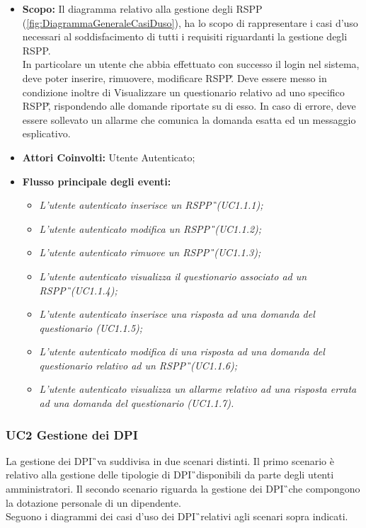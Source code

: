 		\begin{itemize}
			\item \textbf{Scopo:} Il diagramma relativo alla gestione degli RSPP (\autoref{fig:DiagrammaGeneraleCasiDuso}), ha lo scopo di rappresentare i casi d'uso necessari al soddisfacimento di tutti i requisiti riguardanti la gestione degli RSPP. \\
			In particolare un utente che abbia effettuato con successo il login nel sistema, deve poter inserire, rimuovere, modificare  \gls{RSPP}\G. Deve essere messo in condizione inoltre di Visualizzare un questionario relativo ad uno specifico \gls{RSPP}\G, rispondendo alle domande riportate su di esso. In caso di errore, deve essere sollevato un allarme che comunica la domanda esatta ed un messaggio esplicativo.
			\item \textbf{Attori Coinvolti:} Utente Autenticato;
			\item \textbf{Flusso principale degli eventi:} 
			\begin{itemize}
				\item \textit{L'utente autenticato inserisce un \gls{RSPP}\G\ (UC1.1.1);}
				\item \textit{L'utente autenticato modifica un \gls{RSPP}\G\ (UC1.1.2);}
				\item \textit{L'utente autenticato rimuove un \gls{RSPP}\G\  (UC1.1.3);}
				\item \textit{L'utente autenticato visualizza il questionario associato ad un \gls{RSPP}\G\  (UC1.1.4);}
				\item \textit{L'utente autenticato inserisce una risposta ad una domanda del questionario (UC1.1.5);}
				\item \textit{L'utente autenticato modifica di una risposta ad una domanda del questionario relativo ad un \gls{RSPP}\G\  (UC1.1.6);}
				\item \textit{ L'utente autenticato visualizza un allarme relativo ad una risposta errata ad una domanda del questionario (UC1.1.7).}
			\end{itemize}
		\end{itemize}
	\newpage	
	\subsubsection{UC2 Gestione dei DPI}
		\label{section:UC2}
		La gestione dei  \gls{DPI}\G\ va suddivisa in due scenari distinti. Il primo scenario è relativo alla gestione delle tipologie di \gls{DPI}\G\ disponibili da parte degli utenti amministratori. Il secondo scenario riguarda la gestione dei \gls{DPI}\G\ che compongono la dotazione personale di un dipendente. \\
		Seguono i diagrammi dei casi d'uso dei \gls{DPI}\G\ relativi agli scenari sopra indicati.

